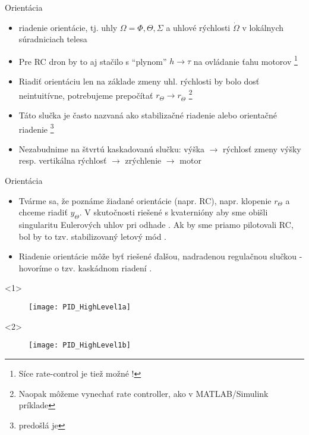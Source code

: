 \begin{frame}[t]{Orientácia}
\begin{itemize}
  \item<1-> riadenie orientácie, tj. uhly $\Omega={\Phi, \Theta, \Sigma}$ a uhlové rýchlosti $\dot\Omega$ v lokálnych súradniciach telesa 
  \item<2-> Pre RC dron by to aj stačilo s ``plynom''   $h\rightarrow\tau$ na ovládanie ťahu  motorov \footnote{Síce rate-control je tiež možné \citep{Boland2015}!} \citep{Boland2015}
  \item<3-> Riadiť orientáciu  len na základe zmeny uhl. rýchlosti  by bolo dosť neintuitívne, potrebujeme prepočítať $r_{\Theta} \rightarrow r_{\dot{\Theta}}$ \footnote{Naopak môžeme vynechať rate controller, ako v MATLAB/Simulink príklade}
      \item<4-> Táto slučka je často nazvaná ako stabilizačné riadenie  alebo orientačné riadenie  \footnote{predošlá je }
      \item<5-> Nezabudnime na štvrtú kaskadovanú slučku: výška $\rightarrow$ rýchlosť zmeny výšky resp. vertikálna rýchlosť  $\rightarrow$ zrýchlenie $\rightarrow$ motor
\end{itemize}
\end{frame}


\begin{frame}[t]{Orientácia}
\begin{itemize}
  \item<1-> Tvárme sa, že poznáme žiadané orientácie (napr. RC), napr. klopenie $r_{\Theta}$ a chceme riadiť $y_{\Theta}$.  V skutočnosti riešené s kvaternióny aby sme obišli singularitu Eulerových uhlov pri odhade \citep{Erasmus2020}. Ak by sme priamo pilotovali RC, bol by to tzv. stabilizovaný letový mód \citep{Boland2015}.
  \item<2-> Riadenie orientácie môže byť riešené ďalšou, nadradenou regulačnou slučkou - hovoríme o tzv. kaskádnom riadení .
  \end{itemize}


    \begin{onlyenv}<1>
  \begin{figure}
\centering
  \texttt{[image: PID\_HighLevel1a]}\\
\end{figure}
\end{onlyenv}



    \begin{onlyenv}<2>
  \begin{figure}
\centering
  \texttt{[image: PID\_HighLevel1b]}\\
\end{figure}
\end{onlyenv}

  \end{frame}



